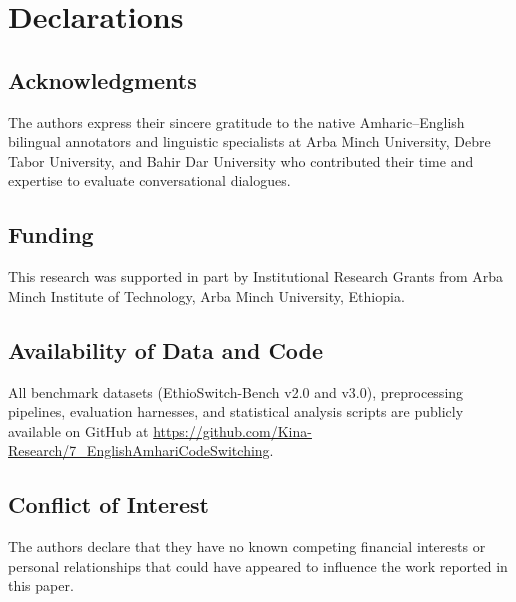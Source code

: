 \documentclass[11pt,a4paper]{article}
\begin{document}
\section*{Declarations}
\subsection*{Acknowledgments}
The authors express their sincere gratitude to the native Amharic--English bilingual annotators and linguistic specialists at Arba Minch University, Debre Tabor University, and Bahir Dar University who contributed their time and expertise to evaluate conversational dialogues.

\subsection*{Funding}
This research was supported in part by Institutional Research Grants from Arba Minch Institute of Technology, Arba Minch University, Ethiopia.

\subsection*{Availability of Data and Code}
All benchmark datasets (EthioSwitch-Bench v2.0 and v3.0), preprocessing pipelines, evaluation harnesses, and statistical analysis scripts are publicly available on GitHub at \url{https://github.com/Kina-Research/7_EnglishAmhariCodeSwitching}.

\subsection*{Conflict of Interest}
The authors declare that they have no known competing financial interests or personal relationships that could have appeared to influence the work reported in this paper.



\end{document}
